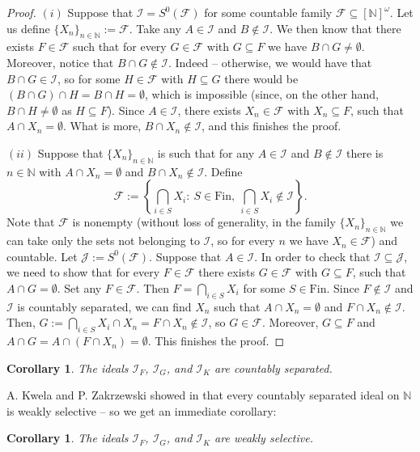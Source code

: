 \documentclass{amsart}
\newtheorem{cor}[thm]{Corollary}
\theoremstyle{definition}
\newcommand{\N}{{\mathbb N}}
\newcommand{\Fin}{\textrm{Fin}}
\newcommand{\I}{\mathcal I}
\newcommand{\J}{\mathcal J}
\newcommand{\calF}{\mathcal{F}}
\newcommand{\InfSubs}{[\N]^{\omega}}
\newcommand{\MB}{S^0}
\begin{document}
\begin{proof}
$(i)$ Suppose that $\I = \MB(\calF)$ for some countable family $\calF \subseteq \InfSubs$. Let us define $\{X_n\}_{n\in\N} := \calF$. Take any $A\in\I$ and $B\notin\I$. We then know that there exists $F\in\calF$ such that for every $G\in\calF$ with $G\subseteq F$ we have $B\cap G \neq\emptyset$. Moreover, notice that $B\cap G \notin\I$. Indeed -- otherwise, we would have that $B\cap G \in\I$, so for some $H\in\calF$ with $H\subseteq G$ there would be $(B\cap G)\cap H = B\cap H =\emptyset$, which is impossible (since, on the other hand, $B\cap H \neq\emptyset$ as $H\subseteq F$). Since $A\in\I$, there exists $X_n \in \calF$ with $X_n \subseteq F$, such that $A\cap X_n = \emptyset$. What is more, $B\cap X_n\notin\I$, and this finishes the proof.

$(ii)$ Suppose that $\{X_n\}_{n\in\N}$ is such that for any $A\in\I$ and $B\notin\I$ there is $n\in\N$ with $A\cap X_n=\emptyset$ and $B\cap X_n\notin\I$. Define
$$\calF := \left\{\bigcap_{i\in S}{X_{i}} :\ S\in\Fin,\ \bigcap_{i\in S}{X_{i}}\notin\I\right\}.$$
Note that $\calF$ is nonempty (without loss of generality, in the family $\{X_n\}_{n\in\N}$ we can take only the sets not belonging to $\I$, so for every $n$ we have $X_n\in\calF$) and countable.
Let $\J := \MB(\calF)$. Suppose that $A\in\I$. In order to check that $\I \subseteq \J$, we need to show that for every $F\in\calF$ there exists $G\in\calF$ with $G\subseteq F$, such that $A\cap G =\emptyset$. Set any $F\in\calF$. Then $F = \bigcap_{i\in S}{X_{i}}$ for some $S\in\Fin$.
Since $F\notin\I$ and $\I$ is countably separated, we can find $X_n$ such that $A\cap X_n=\emptyset$ and $F\cap X_n\notin\I$. Then, $G := \bigcap_{i\in S}{X_{i}} \cap X_n = F\cap X_n \notin\I$, so $G\in\calF$. Moreover, $G\subseteq F$ and $A \cap G = A \cap (F\cap X_n) =\emptyset$. This finishes the proof.
\end{proof}

\begin{cor} \label{cs}
The ideals $\I_F$, $\I_G$, and $\I_K$ are countably separated.
\end{cor}

A. Kwela and P. Zakrzewski showed in \cite[Proposition 4.3]{KwelaZak} that every countably separated ideal on $\N$ is weakly selective -- so we get an immediate corollary:

\begin{cor}
The ideals $\I_F$, $\I_G$, and $\I_K$ are weakly selective.
\end{cor}
\end{document}
